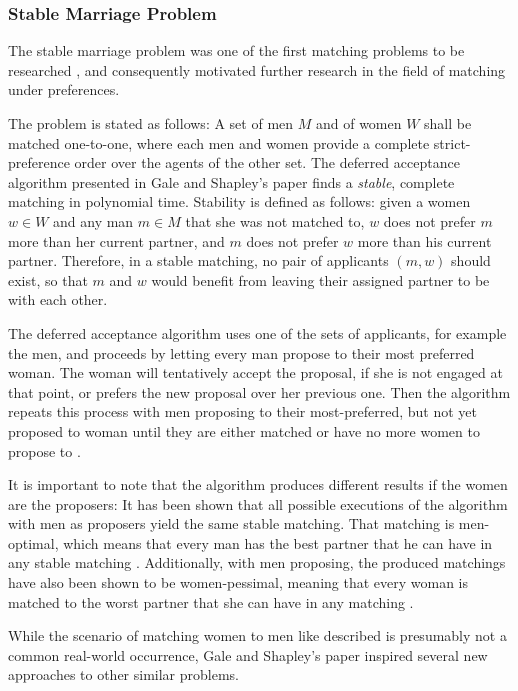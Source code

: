 \subsubsection{Stable Marriage Problem}\label{intro:stable-marriage}
The stable marriage problem was one of the first matching problems to be researched \cite{GaleShapleyOrig}, and consequently motivated further research in the field of matching under preferences.

The problem is stated as follows: A set of men $M$ and of women $W$ shall be matched one-to-one, where each men and women provide a complete strict-preference order over the agents of the other set. The deferred acceptance algorithm presented in Gale and Shapley's paper\cite{GaleShapleyOrig} finds a \textit{stable}, complete matching in polynomial time. Stability is defined as follows: given a women $w \in W$ and any man $m \in M$ that she was not matched to, $w$ does not prefer $m$ more than her current partner, and $m$ does not prefer $w$ more than his current partner. Therefore, in a stable matching, no pair of applicants $(m, w)$ should exist, so that $m$ and $w$ would benefit from leaving their assigned partner to be with each other.

The deferred acceptance algorithm uses one of the sets of applicants, for example the men, and proceeds by letting every man propose to their most preferred woman. The woman will tentatively accept the proposal, if she is not engaged at that point, or prefers the new proposal over her previous one. Then the algorithm repeats this process with men proposing to their most-preferred, but not yet proposed to woman until they are either matched or have no more women to propose to \cite{Gusfield}.

It is important to note that the algorithm produces different results if the women are the proposers: It has been shown that all possible executions of the algorithm with men as proposers yield the same stable matching. That matching is men-optimal, which means that every man has the best partner that he can have in any stable matching \cite{Gusfield}. Additionally, with men proposing, the produced matchings have also been shown to be women-pessimal, meaning that every woman is matched to the worst partner that she can have in any matching \cite{Gusfield}.

While the scenario of matching women to men like described is presumably not a common real-world occurrence, Gale and Shapley's paper inspired several new approaches to other similar problems.

